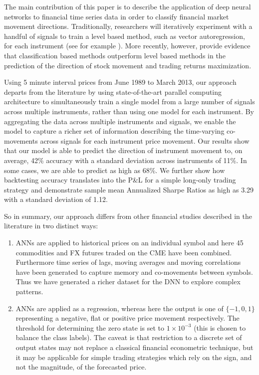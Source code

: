 \documentclass{article}
\begin{document}
The main contribution of this paper is to describe the application of deep neural networks to financial time series data in order to classify financial market movement directions. Traditionally, researchers will iteratively experiment with a handful of signals to train a level based method, such as vector autoregression, for each instrument (see for example \cite{Fkaastra95, Refenes1994, Trippi92}). More recently, however,  \cite{Leung2000} provide evidence that classification based methods outperform level based methods in the prediction of the direction of stock movement and trading returns maximization. 

Using 5 minute interval prices from June 1989 to March 2013,  our approach departs from the literature by using state-of-the-art parallel computing architecture to simultaneously train a single model from a large number of signals across multiple instruments, rather than using one model for each instrument.  By aggregating the data across multiple instruments and signals, we enable the model to capture a richer set of information describing the time-varying co-movements across signals for each instrument price movement. Our results show that our model is able to predict the direction of instrument movement to, on average, 42\% accuracy with a standard deviation across instruments of 11\%. In some cases, we are able to predict as high as 68\%. We further show how backtesting accuracy translates into the P\&L for a simple long-only trading strategy and demonstrate sample mean Annualized Sharpe Ratios as high as 3.29 with a standard deviation of 1.12. 

So in summary, our approach differs from other financial studies described in the literature in two distinct ways:

\begin{enumerate}
\item ANNs are applied to historical prices on an individual symbol and here 45 commodities and FX futures traded on the CME have been combined. Furthermore time series of lags, moving averages and moving correlations have been generated to capture memory and co-movements between symbols. Thus we have generated a richer dataset for the DNN to explore complex patterns.
\item ANNs are applied as a regression, whereas here the output is one of $\{-1,0,1\}$ representing a negative, flat or positive price movement respectively. The threshold for determining the zero state is set to $1\times10^{-3}$ (this is chosen to balance the class labels).  The caveat is that restriction to a discrete set of output states may not replace a classical financial econometric technique, but it may be applicable for simple trading strategies which rely on the sign, and not the magnitude, of the forecasted price.
\end{enumerate}
\end{document}
